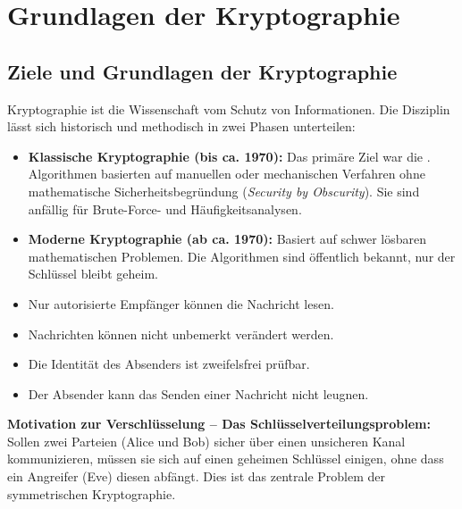 \documentclass[
../../css_summary.tex,
]
{subfiles}
\begin{document}
\section{Grundlagen der Kryptographie}

\subsection{Ziele und Grundlagen der Kryptographie}
Kryptographie ist die Wissenschaft vom Schutz von Informationen. Die Disziplin lässt sich historisch und methodisch in zwei Phasen unterteilen:

\begin{itemize}
   \item \textbf{Klassische Kryptographie (bis ca. 1970):} Das primäre Ziel war die . Algorithmen basierten auf manuellen oder mechanischen Verfahren ohne mathematische Sicherheitsbegründung (\textit{Security by Obscurity}). Sie sind anfällig für Brute-Force- und Häufigkeitsanalysen.
   \item \textbf{Moderne Kryptographie (ab ca. 1970):} Basiert auf schwer lösbaren mathematischen Problemen. Die Algorithmen sind öffentlich bekannt, nur der Schlüssel bleibt geheim.
\end{itemize}

\begin{defbox}
   \begin{itemize}
      \item {} Nur autorisierte Empfänger können die Nachricht lesen.
      \item {} Nachrichten können nicht unbemerkt verändert werden.
      \item {} Die Identität des Absenders ist zweifelsfrei prüfbar.
      \item {} Der Absender kann das Senden einer Nachricht nicht leugnen.
   \end{itemize}
\end{defbox}

\textbf{Motivation zur Verschlüsselung -- Das Schlüsselverteilungsproblem:}
Sollen zwei Parteien (Alice und Bob) sicher über einen unsicheren Kanal kommunizieren, müssen sie sich auf einen geheimen Schlüssel einigen, ohne dass ein Angreifer (Eve) diesen abfängt. Dies ist das zentrale Problem der symmetrischen Kryptographie. %
\end{document}
